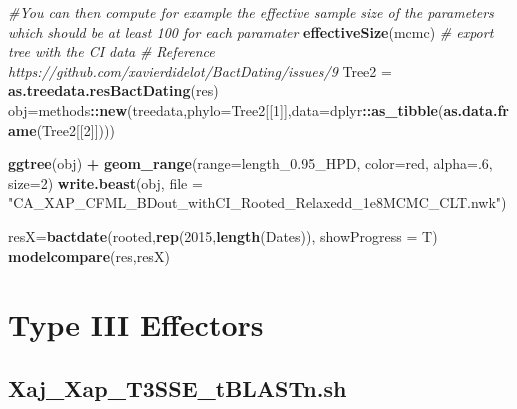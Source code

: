 \documentclass[
]{book}
\newenvironment{Shaded}{\begin{snugshade}}{\end{snugshade}}
\newcommand{\AttributeTok}[1]{\textcolor[rgb]{0.13,0.29,0.53}{#1}}
\newcommand{\CommentTok}[1]{\textcolor[rgb]{0.56,0.35,0.01}{\textit{#1}}}
\newcommand{\DecValTok}[1]{\textcolor[rgb]{0.00,0.00,0.81}{#1}}
\newcommand{\FunctionTok}[1]{\textcolor[rgb]{0.13,0.29,0.53}{\textbf{#1}}}
\newcommand{\NormalTok}[1]{#1}
\newcommand{\OtherTok}[1]{\textcolor[rgb]{0.56,0.35,0.01}{#1}}
\newcommand{\SpecialCharTok}[1]{\textcolor[rgb]{0.81,0.36,0.00}{\textbf{#1}}}
\newcommand{\StringTok}[1]{\textcolor[rgb]{0.31,0.60,0.02}{#1}}
\begin{document}
\begin{Shaded}
\begin{Highlighting}[]
\CommentTok{\#You can then compute for example the effective sample size of the parameters which should be at least 100 for each paramater}
\FunctionTok{effectiveSize}\NormalTok{(mcmc)}
\CommentTok{\# export tree with the CI data}
\CommentTok{\# Reference https://github.com/xavierdidelot/BactDating/issues/9}
\NormalTok{Tree2 }\OtherTok{=} \FunctionTok{as.treedata.resBactDating}\NormalTok{(res)}
\NormalTok{obj}\OtherTok{=}\NormalTok{methods}\SpecialCharTok{::}\FunctionTok{new}\NormalTok{(}\StringTok{\textquotesingle{}treedata\textquotesingle{}}\NormalTok{,}\AttributeTok{phylo=}\NormalTok{Tree2[[}\DecValTok{1}\NormalTok{]],}\AttributeTok{data=}\NormalTok{dplyr}\SpecialCharTok{::}\FunctionTok{as\_tibble}\NormalTok{(}\FunctionTok{as.data.frame}\NormalTok{(Tree2[[}\DecValTok{2}\NormalTok{]])))}

\FunctionTok{ggtree}\NormalTok{(obj) }\SpecialCharTok{+} \FunctionTok{geom\_range}\NormalTok{(}\AttributeTok{range=}\StringTok{\textquotesingle{}length\_0.95\_HPD\textquotesingle{}}\NormalTok{, }\AttributeTok{color=}\StringTok{\textquotesingle{}red\textquotesingle{}}\NormalTok{, }\AttributeTok{alpha=}\NormalTok{.}\DecValTok{6}\NormalTok{, }\AttributeTok{size=}\DecValTok{2}\NormalTok{)}
\FunctionTok{write.beast}\NormalTok{(obj, }\AttributeTok{file =} \StringTok{"CA\_XAP\_CFML\_BDout\_withCI\_Rooted\_Relaxedd\_1e8MCMC\_CLT.nwk"}\NormalTok{)}

\NormalTok{resX}\OtherTok{=}\FunctionTok{bactdate}\NormalTok{(rooted,}\FunctionTok{rep}\NormalTok{(}\DecValTok{2015}\NormalTok{,}\FunctionTok{length}\NormalTok{(Dates)),  }\AttributeTok{showProgress =}\NormalTok{ T)}
\FunctionTok{modelcompare}\NormalTok{(res,resX)}
\end{Highlighting}
\end{Shaded}

\section{Type III Effectors}\label{type-iii-effectors-1}

\subsection{Xaj\_Xap\_T3SSE\_tBLASTn.sh}\label{tblastn-script}
\end{document}
